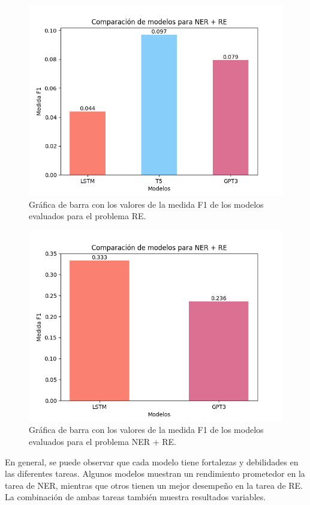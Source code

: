 \documentclass[10pt]{article} %
\begin{document}
		\begin{figure}[h!]
		\centering
		\includegraphics[scale=0.5]{../images/RE_bar}
		\caption{Gr\'afica de barra con los valores de la medida F1 de los modelos evaluados para el problema RE.}
		\label{RE}
	\end{figure}

	
	\begin{figure}[h]
		\centering
		\includegraphics[scale=0.5]{../images/NER_RE_bar}
		\caption{Gr\'afica de barra con los valores de la medida F1 de los modelos evaluados para el problema NER + RE.}
		\label{NR}
	\end{figure}
	
	En general, se puede observar que cada modelo tiene fortalezas y debilidades en las diferentes tareas. Algunos modelos muestran un rendimiento prometedor en la tarea de NER, mientras que otros tienen un mejor desempeño en la tarea de RE. La combinación de ambas tareas también muestra resultados variables.
	
\end{document}

